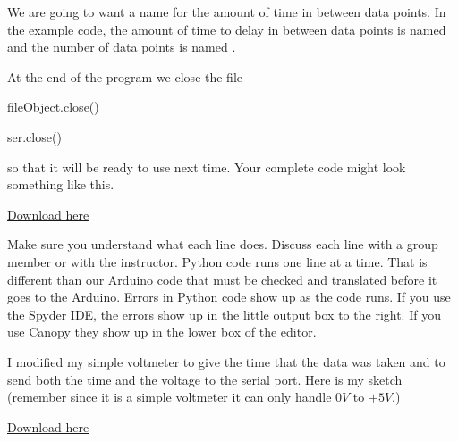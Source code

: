We are going to want a name for the amount of time in between data points. In the example code, the amount of time to delay in between data points is named  and the number of data points is named .

At the end of the program we close the file

\vspace{.1in}
\begin{python}
	fileObject.close()
\end{python}

\begin{python}
	ser.close()
\end{python}
\vspace{.1in}

\noindent so that it will be ready to use next time. Your complete code might look
something like this.

\href{https://raw.githubusercontent.com/rtlines/IntermediateLabPH250/main/Code/Data2Computer_PythonSide_Win.py}{Download here}


Make sure you understand what each line does. Discuss each line with a group member or with the instructor. Python code runs one line at a time. That is different than our Arduino code that must be checked and translated before it goes to the Arduino. Errors in Python code show up as the code runs. If you use the Spyder IDE, the errors show up in the little output box to the
right. If you use Canopy they show up in the lower box of the editor. 

I modified my simple voltmeter to give the time that the data was taken and to send both the time and the voltage to the serial port. Here is my sketch (remember since it is a simple voltmeter it can only handle $0\unit{V}$ to $+5\unit{V}.$)

\href{https://raw.githubusercontent.com/rtlines/IntermediateLabPH250/main/Code/Data2Computer_ArduinoSide_Win.ino}{Download here}



